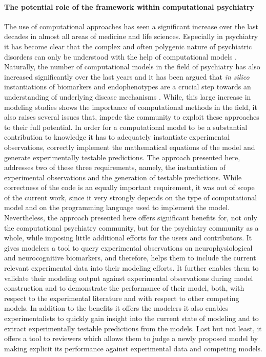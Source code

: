 \documentclass[a4paper,10pt]{article}
\begin{document}
\paragraph{The potential role of the framework within computational psychiatry}
The use of computational approaches has seen a significant increase over the last decades in almost all areas of medicine and life sciences. Especially in psychiatry it has 
become clear that the complex and often polygenic nature of psychiatric disorders can only be understood with the help of computational models \cite{Adams2016,Wang2014,Friston2014,Corlett2014,Stephan2014,
Montague2012,Siekmeier2015}.
Naturally, the number of computational models in the field of psychiatry has also increased significantly over the last years and it has been argued that 
\textit{in silico} instantiations of biomarkers and endophenotypes are a crucial step towards an understanding of underlying disease mechanisms \cite{Siekmeier2015}. While, this large increase in 
modeling studies shows the importance of computational methods in the field, it also raises several issues that, impede the community to exploit these 
approaches to their full potential. In order for a computational model to be a substantial contribution to knowledge it has to adequately instantiate experimental observations,
correctly implement the mathematical equations of the model and generate experimentally testable predictions. The approach presented here, addresses two of these three requirements, namely, 
the instantiation of experimental observations and the generation of testable predictions. While correctness of the code is an equally important requirement, it was out of scope of the
current work, since it very strongly depends on the type of computational model and on the programming language used to implement the model. Nevertheless, the
approach  presented here offers significant benefits for, not only the computational psychiatry community, but for the psychiatry community as a whole, while imposing little additional efforts
for the users and contributors. It gives modelers a tool to query experimental observations on neurophysiological and neurocognitive biomarkers, and therefore, helps them to
include the current relevant experimental data into their modeling efforts. It further enables them to validate their modeling output against experimental observations during model construction
and to demonstrate the performance of their model, both, with respect to the experimental literature and with respect to other competing models. In addition to the benefits it offers
the modelers it also enables experimentalists to quickly gain insight into the current state of modeling and to extract experimentally testable predictions from the models. Last but not least,
it offers a tool to reviewers which allows them to judge a newly proposed model by making explicit its performance against experimental data and competing models.
\end{document}
